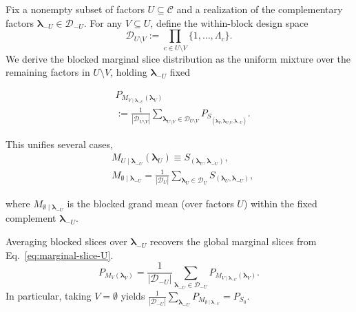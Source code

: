 Fix a nonempty subset of factors $U\subseteq\mathcal{C}$ and a realization of
the complementary factors $\boldsymbol{\lambda}_{-U}\in\mathcal{D}_{-U}$.
For any $V\subseteq U$, define the within-block design space
\[
\mathcal{D}_{U\setminus V}
:=
\prod_{c\in U\setminus V}\{1,\dots,\Lambda_c\}.
\]
We derive the blocked marginal slice distribution as the uniform mixture
over the remaining factors in $U\setminus V$, holding $\boldsymbol{\lambda}_{-U}$
fixed

\begin{align}
\label{eq:blocked-slice}
&P_{M_{V\mid \boldsymbol{\lambda}_{-U}}(\boldsymbol{\lambda}_V)} \\
&:=\frac{1}{|\mathcal{D}_{U\setminus V}|}
\sum_{\boldsymbol{\lambda}_{U\setminus V}\in\mathcal{D}_{U\setminus V}}
P_{S_{(\boldsymbol{\lambda}_V,\boldsymbol{\lambda}_{U\setminus V},\boldsymbol{\lambda}_{-U})}}.
\end{align}

This unifies several cases,
\begin{align}
&M_{U\mid \boldsymbol{\lambda}_{-U}}(\boldsymbol{\lambda}_U)
\equiv S_{(\boldsymbol{\lambda}_U,\boldsymbol{\lambda}_{-U})}, \\
&M_{\emptyset\mid \boldsymbol{\lambda}_{-U}}
=
\frac{1}{|\mathcal{D}_U|}
\sum_{\boldsymbol{\lambda}_U\in\mathcal{D}_U}
S_{(\boldsymbol{\lambda}_U,\boldsymbol{\lambda}_{-U})},
\end{align}

where $M_{\emptyset\mid \boldsymbol{\lambda}_{-U}}$ is the blocked grand mean
(over factors $U$) within the fixed complement $\boldsymbol{\lambda}_{-U}$.

Averaging blocked slices over $\boldsymbol{\lambda}_{-U}$ recovers the global
marginal slices from Eq.~\eqref{eq:marginal-slice-U}.
\begin{equation}
\label{eq:blocked-to-global-slice}
P_{M_V(\boldsymbol{\lambda}_V)}
=
\frac{1}{|\mathcal{D}_{-U}|}
\sum_{\boldsymbol{\lambda}_{-U}\in\mathcal{D}_{-U}}
P_{M_{V\mid \boldsymbol{\lambda}_{-U}}(\boldsymbol{\lambda}_V)}.
\end{equation}
In particular, taking $V=\emptyset$ yields
$\frac{1}{|\mathcal{D}_{-U}|}\sum_{\boldsymbol{\lambda}_{-U}}P_{M_{\emptyset\mid \boldsymbol{\lambda}_{-U}}}
= P_{S_0}$.

